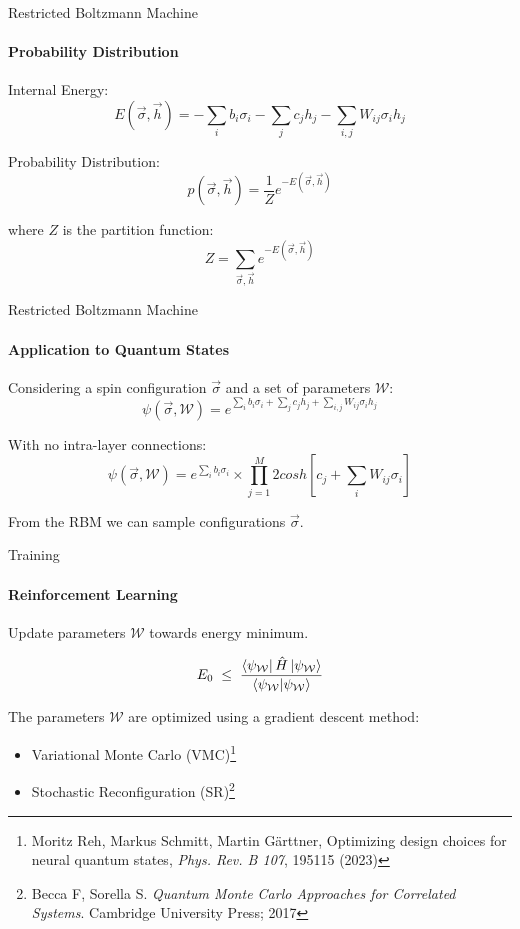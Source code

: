 \documentclass{beamer}
\begin{document}
\begin{frame}{Restricted Boltzmann Machine}
\framesubtitle{Probability Distribution}
Internal Energy:
$$E(\vec{\sigma}, \vec{h}) = -\sum_{i} b_i \sigma_i - \sum_{j} c_j h_j - \sum_{i,j} W_{ij} \sigma_i h_j$$

Probability Distribution:
$$p(\vec{\sigma}, \vec{h}) = \frac{1}{Z} e^{-E(\vec{\sigma}, \vec{h})}$$

where $Z$ is the partition function:
$$Z = \sum_{\vec{\sigma}, \vec{h}} e^{-E(\vec{\sigma}, \vec{h})}$$
\end{frame}

\begin{frame}{Restricted Boltzmann Machine}
\framesubtitle{Application to Quantum States}
Considering a spin configuration $\vec{\sigma}$ and a set of parameters $\mathcal{W}$:
$$\psi\left( \vec{\sigma}, \mathcal{W} \right) = e^{\sum_{i} b_i \sigma_i + \sum_{j} c_j h_j + \sum_{i,j} W_{ij} \sigma_i h_j}$$

With no intra-layer connections:
$$\psi\left( \vec{\sigma}, \mathcal{W} \right) = e^{\sum_{i} b_i \sigma_i} \times \prod_{j=1}^{M} {2 cosh\left[c_j + \sum_{i} W_{ij} \sigma_i\right]}$$

From the RBM we can sample configurations $\vec{\sigma}$.

\end{frame}

\begin{frame}{Training}
\framesubtitle{Reinforcement Learning}
Update parameters $\mathcal{W}$ towards energy minimum.

$$
E_0 \;\le\;
\frac{\bra{\psi_{\mathcal{W}}} \hat H \ket{\psi_{\mathcal{W}}} }
	{\bra{\psi_{\mathcal{W}}} \ket{\psi_{\mathcal{W}}}}
$$
\baselineskip

The parameters $\mathcal{W}$ are optimized using a gradient descent method:
\begin{itemize}
	\item Variational Monte Carlo (VMC)\footnote{Moritz Reh, Markus Schmitt, Martin Gärttner, Optimizing design choices for neural quantum states, \textit{Phys. Rev. B 107}, 195115 (2023)}
	\item Stochastic Reconfiguration (SR)\footnote{Becca F, Sorella S. \textit{Quantum Monte Carlo Approaches for Correlated Systems}. Cambridge University Press; 2017}
\end{itemize}

\end{frame}
\end{document}
